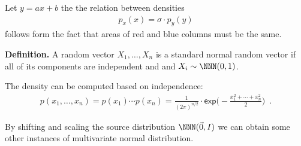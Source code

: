 \documentclass[landscape,footrule]{foils}
\begin{document}
Let $y=ax + b$ the the relation between densities 
\begin{align*}
p_x(x)=\sigma\cdot p_y(y)
\end{align*}
follows form the fact that areas of red and blue columns must be the same.






\vspace*{-1.0cm}

\textbf{Definition.} A random vector $X_1,\ldots, X_n$ is a standard normal random vector if all of its components are independent and and $X_i\sim \NNN(0,1)$.
\begin{triangles}
\item The density can be computed based on independence:
\begin{align*}
p(x_1,\ldots,x_n)=p(x_1)\cdots p(x_n)=\frac{1}{(2\pi)^{n/2}}\cdot\mathsf{exp}\Biggl(-\frac{x_1^2+\cdots+x_n^2}{2}\Biggl)\enspace.
\end{align*}
\end{triangles}


By shifting and scaling the source distribution $\NNN(\vec{0},I)$ we can obtain some other instances of multivariate normal distribution.
\vspace*{-1cm}
\end{document}
